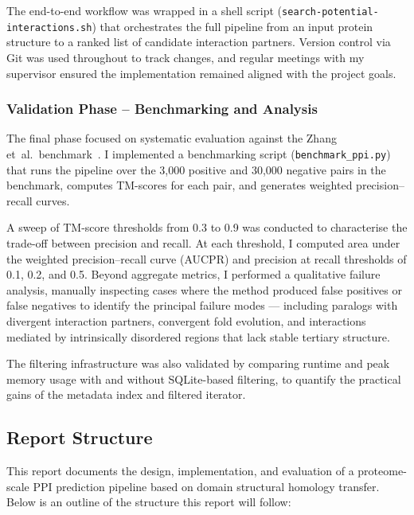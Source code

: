 The end-to-end workflow was wrapped in a shell script (\texttt{search-potential-interactions.sh}) that orchestrates the full pipeline from an input protein structure to a ranked list of candidate interaction partners.
Version control via Git was used throughout to track changes, and regular meetings with my supervisor ensured the implementation remained aligned with the project goals.

\subsubsection{Validation Phase -- Benchmarking and Analysis}

The final phase focused on systematic evaluation against the Zhang et~al.\ benchmark~\cite{zhang2025ppi}.
I implemented a benchmarking script (\texttt{benchmark\_ppi.py}) that runs the pipeline over the 3{,}000 positive and 30{,}000 negative pairs in the benchmark, computes TM-scores for each pair, and generates weighted precision--recall curves.

A sweep of TM-score thresholds from 0.3 to 0.9 was conducted to characterise the trade-off between precision and recall.
At each threshold, I computed area under the weighted precision--recall curve (AUCPR) and precision at recall thresholds of 0.1, 0.2, and 0.5.
Beyond aggregate metrics, I performed a qualitative failure analysis, manually inspecting cases where the method produced false positives or false negatives to identify the principal failure modes --- including paralogs with divergent interaction partners, convergent fold evolution, and interactions mediated by intrinsically disordered regions that lack stable tertiary structure.

The filtering infrastructure was also validated by comparing runtime and peak memory usage with and without SQLite-based filtering, to quantify the practical gains of the metadata index and filtered iterator.


\subsection{Report Structure}
\label{sec:intro-report-structure}

This report documents the design, implementation, and evaluation of a proteome-scale PPI prediction pipeline based on domain structural homology transfer.
Below is an outline of the structure this report will follow:

